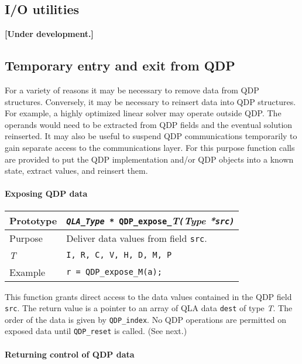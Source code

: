 \documentclass{article}
\newcommand{\allNumericTypes}{{\tt I, R, C, V, H, D, M, P}}
\newcommand{\ttdash}{{\tt \_}}
\newcommand{\itt}{\it T}
\begin{document}
\subsection{I/O utilities}

{\bf [Under development.]}

\subsection{Temporary entry and exit from QDP}

For a variety of reasons it may be necessary to remove data from QDP
structures.  Conversely, it may be necessary to reinsert data into QDP
structures.  For example, a highly optimized linear solver may
operate outside QDP.  The operands would need to be extracted from QDP
fields and the eventual solution reinserted.  It may also be useful to
suspend QDP communications temporarily to gain separate access to the
communications layer.  For this purpose function calls are provided to
put the QDP implementation and/or QDP objects into a known state,
extract values, and reinsert them.

\paragraph{Exposing QDP data}

\begin{flushleft}
\begin{tabular}{|l|l|}
  \hline
  Prototype      & {\tt {\it QLA}\ttdash{\it Type *} QDP}\ttdash{\tt expose}\ttdash\itt{\tt (}{\it Type *}{\tt src)}\\
\hline
Purpose        & Deliver data values from field {\tt src}. \\
\hline
  \itt     & \allNumericTypes \\
\hline
Example  & \verb|r = QDP_expose_M(a);| \\
\hline
  \end{tabular}
\end{flushleft}
%
This function grants direct access to the data values contained in the
QDP field {\tt src}.  The return value is a pointer to an array of QLA
data {\tt dest} of type {\it T}.  The order of the data is given by
\verb|QDP_index|.  No QDP operations are permitted on exposed
data until \verb|QDP_reset| is called. (See next.)

\paragraph{Returning control of QDP data}
\end{document}
